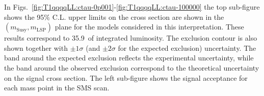 In Figs.~\ref{fig:T1qqqqLL:ctau-0p001}-\ref{fig:T1qqqqLL:ctau-100000}
the top sub-figure shows the 95\% C.L. upper limits on the cross
section are shown in the $(m_{\mathrm{Susy}},m_{\mathrm{LSP}})$ plane
for the models considered in this interpretation. These results
correspond to 35.9~\ifb of integrated luminosity. The exclusion
contour is also shown together with $\pm1\sigma$ (and $\pm2\sigma$ for
the expected exclusion) uncertainty.  The band around the expected
exclusion reflects the experimental uncertainty, while the band around
the observed exclusion correspond to the theoretical uncertainty on
the signal cross section. The left sub-figure shows the signal
acceptance for each mass point in the SMS scan. 


